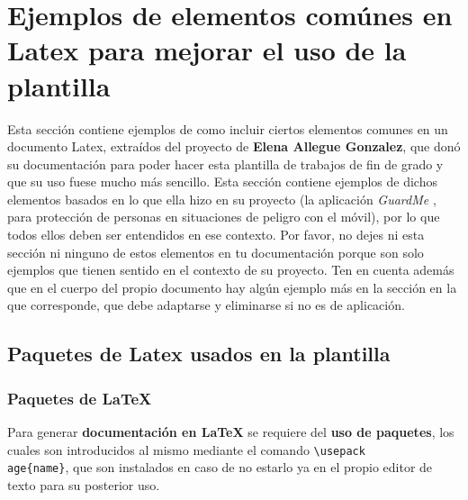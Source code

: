 


\section*{Ejemplos de elementos comúnes en Latex para mejorar el uso de la plantilla}

Esta sección contiene ejemplos de como incluir ciertos elementos comunes en un documento Latex, extraídos del proyecto de \textbf{Elena Allegue Gonzalez}, que donó su documentación para poder hacer esta plantilla de trabajos de fin de grado y que su uso fuese mucho más sencillo. Esta sección contiene ejemplos de dichos elementos basados en lo que ella hizo en su proyecto (la aplicación \textit{GuardMe} \cite{Elena19LNE}, para protección de personas en situaciones de peligro con el móvil), por lo que todos ellos deben ser entendidos en ese contexto. Por favor, no dejes ni esta sección ni ninguno de estos elementos en tu documentación porque son solo ejemplos que tienen sentido en el contexto de su proyecto. Ten en cuenta además que en el cuerpo del propio documento hay algún ejemplo más en la sección en la que corresponde, que debe adaptarse y eliminarse si no es de aplicación.

\subsection*{Paquetes de Latex usados en la plantilla}

\subsubsection*{Paquetes de LaTeX}
Para generar \textbf{documentación en LaTeX} se requiere del \textbf{uso de paquetes}, los cuales son introducidos al mismo mediante el comando \texttt{\textbackslash usepack\\
age\{name\}}, que son instalados en caso de no estarlo ya en el propio editor de texto para su posterior uso.\newline

